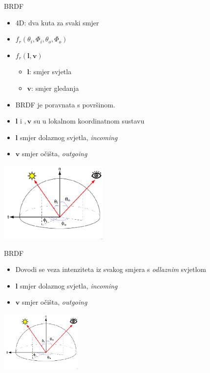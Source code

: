 \documentclass[9pt]{beamer}
\begin{document}
\begin{frame}{BRDF}
	\begin{itemize}
		\item 4D: dva kuta za svaki smjer
		\item $f_r(\theta_i, \Phi_i, \theta_o, \Phi_o)$
		\item $f_r(\mathbf{l}, \mathbf{v})$
		\begin{itemize}
			\item $\mathbf{l}$: smjer svjetla
			\item $\mathbf{v}$: smjer gledanja
		\end{itemize}
		\item BRDF je poravnata s površinom.
		\item $\mathbf{l}$ i $, \mathbf{v}$ su u lokalnom koordinatnom sustavu
		\item \alert{$\mathbf{l}$ smjer dolaznog svjetla, \textsl{incoming}} 
		\item \alert{$\mathbf{v}$ smjer očišta, \textsl{outgoing}} 
	\end{itemize}
	\begin{center}
		\includegraphics[height=4cm]{slike/brdf.png}
	\end{center}
\end{frame}

\begin{frame}{BRDF}
	\begin{itemize}
		\item Dovodi se veza intenziteta iz svakog smjera s \textsl{odlaznim} svjetlom
		\item \alert{$\mathbf{l}$ smjer dolaznog svjetla, \textsl{incoming}} 
		\item \alert{$\mathbf{v}$ smjer očišta, \textsl{outgoing}} 
	\end{itemize}
	\begin{center}
		\includegraphics[height=3cm]{slike/brdf.png}
	\end{center}
\end{frame}
\end{document}
